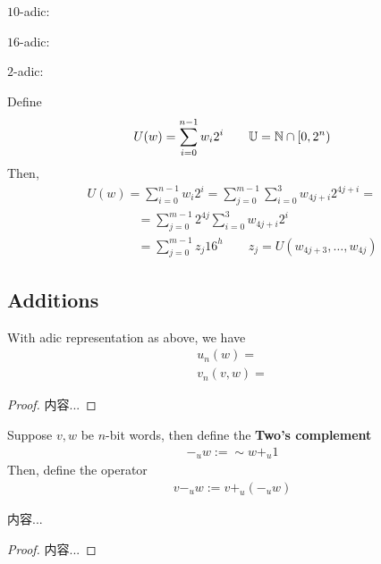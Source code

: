\documentclass[Total.tex]{subfiles}
\begin{document}
			\begin{example}
				$10$-adic: 
				
				$16$-adic:
				
				$2$-adic:
				
				Define
				\begin{gather*}
					U(w)=\sum_{i=0}^{n-1} w_i 2^i\qquad \mathbb{U}=\mathbb{N}\cap [0,2^n)
				\end{gather*}
				Then,
				\begin{gather*}
					U(w)=\sum_{i=0}^{n-1} w_i 2^i=\sum_{j=0}^{m-1}\sum_{i=0}^3 w_{4j+i}2^{4j+i}=\\
					\qquad\qquad =\sum_{j=0}^{m-1} 2^{4j}\sum_{i=0}^3 w_{4j+i}2^i\\
					\qquad\qquad =\sum_{j=0}^{m-1} z_j 16^h\qquad z_j=U(w_{4j+3},\dots,w_{4j})
				\end{gather*}
			\end{example}
			
			\subsection{Additions}
			\begin{Def}
				With adic representation as above, we have
				\begin{gather*}
					u_n(w)=\\
					v_n(v,w)=
				\end{gather*}
			\end{Def}
			\begin{proposition}
				
			\end{proposition}
			\begin{proof}
				内容...
			\end{proof}
			
			\begin{Def}
				Suppose $v,w$ be $n$-bit words, then define the \textbf{Two's complement}
				\begin{gather*}
					-_uw:=\sim w+_u 1
				\end{gather*}
				Then, define the operator
				\begin{gather*}
					v-_u w:=v+_u (-_u w)
				\end{gather*}
			\end{Def}
			\begin{proposition}
				内容...
			\end{proposition}
			\begin{proof}
				内容...
			\end{proof}
			
\end{document}
